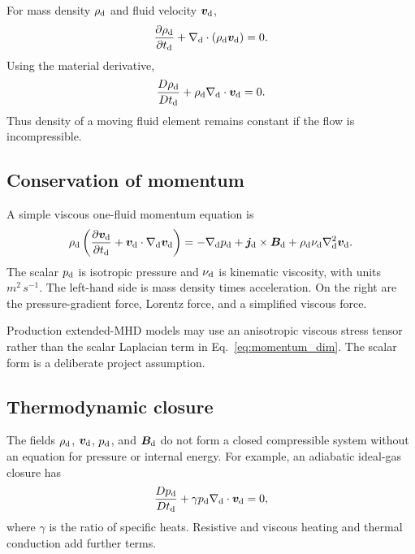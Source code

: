 For mass density $\rho_{\rm d}$ and fluid velocity $\bm{v}_{\rm d}$,
\begin{equation}
\frac{\partial\rho_{\rm d}}{\partial t_{\rm d}}
+\nabla_{\rm d}\cdot(\rho_{\rm d}\bm{v}_{\rm d})=0.
\label{eq:continuity_dim}
\end{equation}
Using the material derivative,
\begin{equation}
\frac{D\rho_{\rm d}}{Dt_{\rm d}}+\rho_{\rm d}\nabla_{\rm d}\cdot\bm{v}_{\rm d}=0.
\end{equation}
Thus density of a moving fluid element remains constant if the flow is incompressible.

\subsection{Conservation of momentum}

A simple viscous one-fluid momentum equation is
\begin{equation}
\rho_{\rm d}\left(
\frac{\partial\bm{v}_{\rm d}}{\partial t_{\rm d}}
+\bm{v}_{\rm d}\cdot\nabla_{\rm d}\bm{v}_{\rm d}
\right)
=-\nabla_{\rm d}p_{\rm d}
+\bm{j}_{\rm d}\times\bm{B}_{\rm d}
+\rho_{\rm d}\nu_{\rm d}\nabla_{\rm d}^{2}\bm{v}_{\rm d}.
\label{eq:momentum_dim}
\end{equation}
The scalar $p_{\rm d}$ is isotropic pressure and $\nu_{\rm d}$ is kinematic viscosity, with units $\unit{m^2\,s^{-1}}$. The left-hand side is mass density times acceleration. On the right are the pressure-gradient force, Lorentz force, and a simplified viscous force.

Production extended-MHD models may use an anisotropic viscous stress tensor rather than the scalar Laplacian term in Eq.~\eqref{eq:momentum_dim}. The scalar form is a deliberate project assumption.

\subsection{Thermodynamic closure}

The fields $\rho_{\rm d}$, $\bm{v}_{\rm d}$, $p_{\rm d}$, and $\bm{B}_{\rm d}$ do not form a closed compressible system without an equation for pressure or internal energy. For example, an adiabatic ideal-gas closure has
\begin{equation}
\frac{D p_{\rm d}}{Dt_{\rm d}}+\gamma p_{\rm d}\nabla_{\rm d}\cdot\bm{v}_{\rm d}=0,
\end{equation}
where $\gamma$ is the ratio of specific heats. Resistive and viscous heating and thermal conduction add further terms.

